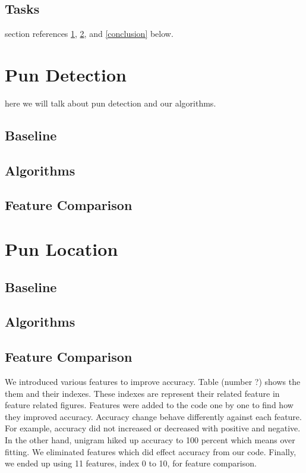 \documentclass{article}
\begin{document}
\subsection{Tasks}

section references \ref{pun_detection}, \ref{pun_location}, and
\ref{conclusion} below.


\section{Pun Detection}
\label{pun_detection}

here we will talk about pun detection and our algorithms.

\subsection{Baseline}

\subsection{Algorithms}

\subsection{Feature Comparison}

\section{Pun Location}
\label{pun_location}

\subsection{Baseline}

\subsection{Algorithms}

\subsection{Feature Comparison}
We introduced various features to improve accuracy. Table (number ?) shows the them and their indexes. These indexes are represent their related feature in feature related figures. Features were added to the code one by one to find how they improved accuracy. Accuracy change behave differently against each feature. For example, accuracy did not increased or decreased with positive and negative. In the other hand, unigram hiked up accuracy to 100 percent which means over fitting. We eliminated features which did effect accuracy from our code. Finally, we ended up using 11 features, index 0 to 10, for feature comparison.\\
\end{document}
